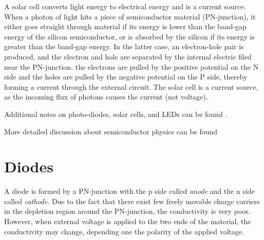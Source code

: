 \begin{itemize}
A solar cell converts light energy to electrical energy and is a current 
source. When a photon of light hits a piece of semiconductor material 
(PN-junction), it either goes straight through material if its energy is 
lower than the band-gap energy of the silicon semiconductor, or is absorbed
by the silicon if its energy is greater than the band-gap energy. In the
latter case, an electron-hole pair is produced, and the electron and hole
are separated by the internal electric filed near the PN-junction. the 
electrons are pulled by the positive potential on the N side and the 
holes are pulled by the negative potential on the P side, thereby forming
a current through the external circuit. The solar cell is a current source,
as the incoming flux of photons causes the current (not voltage).


\end{itemize}

Additional notes on photo-diodes, solar cells, and LEDs can be found
.

More detailed discussion about semiconductor physics can be found

\section*{Diodes}

A diode is formed by a PN-junction with the p side called {\em anode} and the
n side called {\em cathode}. Due to the fact that there exist few freely movable 
charge carriers in the depletion region around the PN-junction, the conductivity
is very poor. However, when external voltage is applied to the two ends of the 
material, the conductivity may change, depending one the polarity of the applied
voltage.


